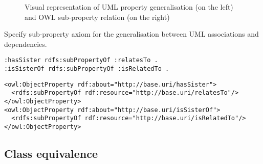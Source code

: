 \begin{figure}[!ht]
\begin{subfigure}{.7\textwidth}
	\end{subfigure}
	\caption{Visual representation of UML property generalisation (on the left) and OWL sub-property relation (on the right)}
	\label{fig:generalisation-equal-visual}
\end{figure}

\begin{trule}
	\label{rule:generalisation-property-core}
	Specify sub-property axiom for the generalisation between UML associations and dependencies.
\end{trule}

\vspace{-\parskip}
\begin{minipage}[b]{.385\textwidth}
\begin{lstlisting}[language=Turtle, caption={Property specialisation in Turtle syntax}, captionpos=b]
:hasSister rdfs:subPropertyOf :relatesTo .
:isSisterOf rdfs:subPropertyOf :isRelatedTo .
\end{lstlisting}
\end{minipage}%
\quad\vspace{-\parskip}
\begin{minipage}[b]{.56\textwidth}
\begin{lstlisting}[language=RDF/XML, caption={Property specialisation in RDF/XML syntax}, captionpos=b]
<owl:ObjectProperty rdf:about="http://base.uri/hasSister">
  <rdfs:subPropertyOf rdf:resource="http://base.uri/relatesTo"/>
</owl:ObjectProperty>
<owl:ObjectProperty rdf:about="http://base.uri/isSisterOf">
  <rdfs:subPropertyOf rdf:resource="http://base.uri/isRelatedTo"/>
</owl:ObjectProperty>
\end{lstlisting}
\end{minipage}
\vspace{-\parskip}

\subsection{Class equivalence}

